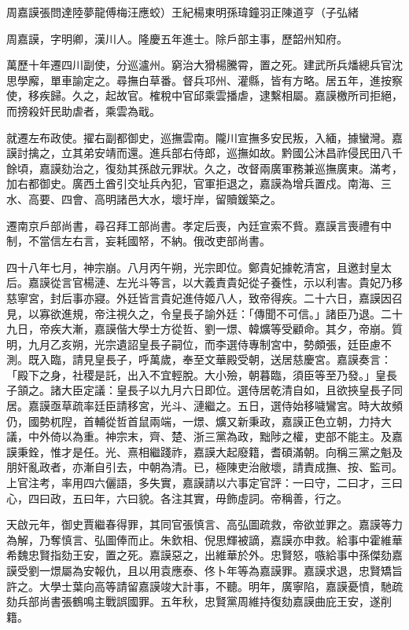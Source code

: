 
\begin{pinyinscope}
周嘉謨張問達陸夢龍傅梅汪應蛟）王紀楊東明孫瑋鐘羽正陳道亨（子弘緒

周嘉謨，字明卿，漢川人。隆慶五年進士。除戶部主事，歷韶州知府。

萬歷十年遷四川副使，分巡瀘州。窮治大猾楊騰霄，置之死。建武所兵燔總兵官沈思學廨，單車諭定之。尋撫白草番。督兵邛州、灌縣，皆有方略。居五年，進按察使，移疾歸。久之，起故官。榷稅中官邱乘雲播虐，逮繫相屬。嘉謨檄所司拒絕，而搒殺奸民助虐者，乘雲為戢。

就遷左布政使。擢右副都御史，巡撫雲南。隴川宣撫多安民叛，入緬，據蠻灣。嘉謨討擒之，立其弟安靖而還。進兵部右侍郎，巡撫如故。黔國公沐昌祚侵民田八千餘頃，嘉謨劾治之，復劾其孫啟元罪狀。久之，改督兩廣軍務兼巡撫廣東。滿考，加右都御史。廣西土酋引交址兵內犯，官軍拒退之，嘉謨為增兵置戍。南海、三水、高要、四會、高明諸邑大水，壞圩岸，留贖鍰築之。

遷南京戶部尚書，尋召拜工部尚書。孝定后喪，內廷宣索不貲。嘉謨言喪禮有中制，不當信左右言，妄耗國帑，不納。俄改吏部尚書。

四十八年七月，神宗崩。八月丙午朔，光宗即位。鄭貴妃據乾清宮，且邀封皇太后。嘉謨從言官楊漣、左光斗等言，以大義責貴妃從子養性，示以利害。貴妃乃移慈寧宮，封后事亦寢。外廷皆言貴妃進侍姬八人，致帝得疾。二十六日，嘉謨因召見，以寡欲進規，帝注視久之，令皇長子諭外廷：「傳聞不可信。」諸臣乃退。二十九日，帝疾大漸，嘉謨偕大學士方從哲、劉一燝、韓爌等受顧命。其夕，帝崩。質明，九月乙亥朔，光宗遺詔皇長子嗣位，而李選侍專制宮中，勢頗張，廷臣慮不測。既入臨，請見皇長子，呼萬歲，奉至文華殿受朝，送居慈慶宮。嘉謨奏言：「殿下之身，社稷是託，出入不宜輕脫。大小殮，朝暮臨，須臣等至乃發。」皇長子頷之。諸大臣定議：皇長子以九月六日即位。選侍居乾清自如，且欲挾皇長子同居。嘉謨亟草疏率廷臣請移宮，光斗、漣繼之。五日，選侍始移噦鸞宮。時大故頻仍，國勢杌隉，首輔從哲首鼠兩端，一燝、爌又新秉政，嘉謨正色立朝，力持大議，中外倚以為重。神宗末，齊、楚、浙三黨為政，黜陟之權，吏部不能主。及嘉謨秉銓，惟才是任。光、熹相繼踐祚，嘉謨大起廢籍，耆碩滿朝。向稱三黨之魁及朋奸亂政者，亦漸自引去，中朝為清。已，極陳吏治敝壞，請責成撫、按、監司。上官注考，率用四六儷語，多失實，嘉謨請以六事定官評：一曰守，二曰才，三曰心，四曰政，五曰年，六曰貌。各注其實，毋飾虛詞。帝稱善，行之。

天啟元年，御史賈繼春得罪，其同官張慎言、高弘圖疏救，帝欲並罪之。嘉謨等力為解，乃奪慎言、弘圖俸而止。朱欽相、倪思輝被謫，嘉謨亦申救。給事中霍維華希魏忠賢指劾王安，置之死。嘉謨惡之，出維華於外。忠賢怒，嗾給事中孫傑劾嘉謨受劉一燝屬為安報仇，且以用袁應泰、佟卜年等為嘉謨罪。嘉謨求退，忠賢矯旨許之。大學士葉向高等請留嘉謨竣大計事，不聽。明年，廣寧陷，嘉謨憂憤，馳疏劾兵部尚書張鶴鳴主戰誤國罪。五年秋，忠賢黨周維持復劾嘉謨曲庇王安，遂削籍。


\end{pinyinscope}
